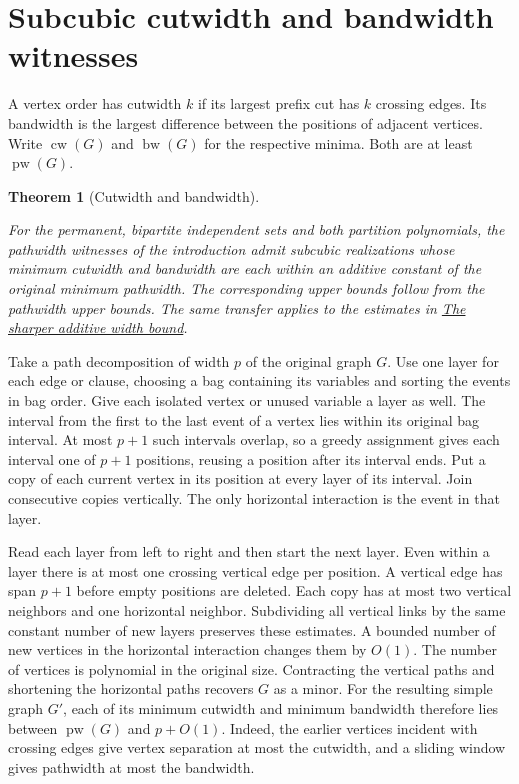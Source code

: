 \documentclass[11pt]{article}
\newtheorem{theorem}{Theorem}[section]
\theoremstyle{definition}
\newcommand{\pw}{\operatorname{pw}}
\begin{document}
\section{Subcubic cutwidth and bandwidth witnesses}\label{sec:layouts}

A vertex order has cutwidth \(k\) if its largest prefix cut has \(k\) crossing edges. Its bandwidth is the largest difference between the positions of adjacent vertices. Write \(\operatorname{cw}(G)\) and \(\operatorname{bw}(G)\) for the respective minima. Both are at least \(\pw(G)\).

\begin{theorem}[Cutwidth and bandwidth]\label{thm:layouts}

For the permanent, bipartite independent sets and both partition polynomials, the pathwidth witnesses of the introduction admit subcubic realizations whose minimum cutwidth and bandwidth are each within an additive constant of the original minimum pathwidth. The corresponding upper bounds follow from the pathwidth upper bounds. The same transfer applies to the estimates in \href{sharper-additive-bound.md}{\emph{The sharper additive width bound}}.

\end{theorem}

Take a path decomposition of width \(p\) of the original graph \(G\). Use one layer for each edge or clause, choosing a bag containing its variables and sorting the events in bag order. Give each isolated vertex or unused variable a layer as well. The interval from the first to the last event of a vertex lies within its original bag interval. At most \(p+1\) such intervals overlap, so a greedy assignment gives each interval one of \(p+1\) positions, reusing a position after its interval ends. Put a copy of each current vertex in its position at every layer of its interval. Join consecutive copies vertically. The only horizontal interaction is the event in that layer.

Read each layer from left to right and then start the next layer. Even within a layer there is at most one crossing vertical edge per position. A vertical edge has span \(p+1\) before empty positions are deleted. Each copy has at most two vertical neighbors and one horizontal neighbor. Subdividing all vertical links by the same constant number of new layers preserves these estimates. A bounded number of new vertices in the horizontal interaction changes them by \(O(1)\). The number of vertices is polynomial in the original size. Contracting the vertical paths and shortening the horizontal paths recovers \(G\) as a minor. For the resulting simple graph \(G'\), each of its minimum cutwidth and minimum bandwidth therefore lies between \(\pw(G)\) and \(p+O(1)\). Indeed, the earlier vertices incident with crossing edges give vertex separation at most the cutwidth, and a sliding window gives pathwidth at most the bandwidth.
\end{document}
